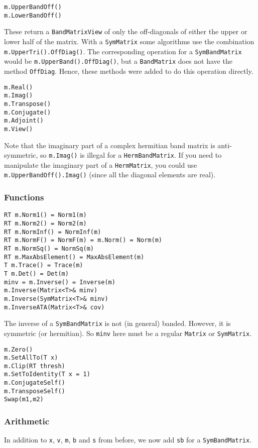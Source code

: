 \documentclass[twoside,letterpaper,11pt]{article}
\renewcommand{\tt}[1]{{\texttt {#1}}}
\begin{document}
\begin{verbatim}
m.UpperBandOff()
m.LowerBandOff()
\end{verbatim}
These return a \tt{BandMatrixView} of only the off-diagonals of either the
upper or lower half of the matrix.  With a \tt{SymMatrix} some algorithms
use the combination \tt{m.UpperTri().OffDiag()}.  The corresponding
operation for a \tt{SymBandMatrix} would be \tt{m.UpperBand().OffDiag()},
but a \tt{BandMatrix} does not have the method \tt{OffDiag}.  
Hence, these methods were added to do this operation directly.

\begin{verbatim}
m.Real()
m.Imag()
m.Transpose()
m.Conjugate()
m.Adjoint()
m.View()
\end{verbatim}
Note that the imaginary part of a complex hermitian band matrix is
anti-symmetric, so \tt{m.Imag()} is illegal for a \tt{HermBandMatrix}.
If you need to manipulate the imaginary part of a \tt{HermMatrix}, 
you could use
\tt{m.UpperBandOff().Imag()} 
(since all the diagonal elements are real).

\subsubsection{Functions}

\begin{verbatim}
RT m.Norm1() = Norm1(m)
RT m.Norm2() = Norm2(m)
RT m.NormInf() = NormInf(m)
RT m.NormF() = NormF(m) = m.Norm() = Norm(m)
RT m.NormSq() = NormSq(m)
RT m.MaxAbsElement() = MaxAbsElement(m)
T m.Trace() = Trace(m)
T m.Det() = Det(m)
minv = m.Inverse() = Inverse(m)
m.Inverse(Matrix<T>& minv)
m.Inverse(SymMatrix<T>& minv)
m.InverseATA(Matrix<T>& cov)
\end{verbatim}
The inverse of a \tt{SymBandMatrix} is not (in general) banded.  
However, it is symmetric (or hermitian).
So \tt{minv} here must be a regular \tt{Matrix} or \tt{SymMatrix}.

\begin{verbatim}
m.Zero()
m.SetAllTo(T x)
m.Clip(RT thresh)
m.SetToIdentity(T x = 1)
m.ConjugateSelf()
m.TransposeSelf()
Swap(m1,m2)
\end{verbatim}

\subsubsection{Arithmetic}

In addition to \tt{x}, \tt{v}, \tt{m}, \tt{b} and \tt{s} from before, 
we now add \tt{sb} for a \tt{SymBandMatrix}.
\end{document}
